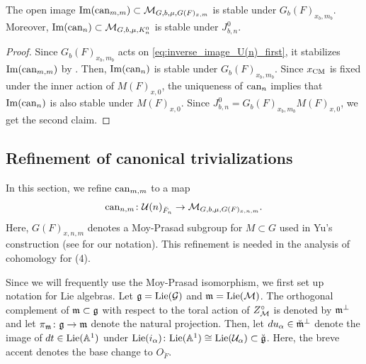 \documentclass[12pt,reqno]{amsart}
\begin{document}
\begin{prop} \label{prop:stability_Img_can_n}
    The open image ${\operatorname{Im}}({\operatorname{can}}_{m, m}) \subset {\mathcal{M}}_{G, b, \mu, G(F)_{x, m}}$ is stable under $G_b(F)_{x_b, m_b}$. Moreover, ${\operatorname{Im}}({\operatorname{can}}_n) \subset {\mathcal{M}}_{G, b, \mu, K_n^0}$ is stable under $J_{b, n}^0$. 
\end{prop}
\begin{proof}
    Since $G_b(F)_{x_b, m_b}$ acts on \eqref{eq:inverse_image_U(n)_first}, it stabilizes ${\operatorname{Im}}({\operatorname{can}}_{m, m})$ by . Then, ${\operatorname{Im}}({\operatorname{can}}_n)$ is stable under $G_b(F)_{x_b, m_b}$. Since $x_{\operatorname{CM}}$ is fixed under the inner action of $M(F)_{x, 0}$, the uniqueness of ${\operatorname{can}}_n$ implies that ${\operatorname{Im}}({\operatorname{can}}_n)$ is also stable under $M(F)_{x, 0}$. Since $J_{b, n}^0 = G_b(F)_{x_b, m_b} M(F)_{x, 0}$, we get the second claim. 
\end{proof}

\subsection{Refinement of canonical trivializations}

In this section, we refine ${\operatorname{can}}_{m, m}$ to a map
\[
    {\operatorname{can}}_{n, m} \colon {\mathcal{U}}(n)_{\breve{F}_n} \to {\mathcal{M}}_{G, b, \mu, G(F)_{x, n, m}}. 
\]
Here, $G(F)_{x, n, m}$ denotes a Moy-Prasad subgroup for $M \subset G$ used in Yu's construction (see  for our notation). This refinement is needed in the analysis of cohomology for  (4).

Since we will frequently use the Moy-Prasad isomorphism, we first set up notation for Lie algebras. Let ${\mathfrak{g}} = {\operatorname{Lie}}({\mathcal{G}})$ and ${\mathfrak{m}} = {\operatorname{Lie}}({\mathcal{M}})$. The orthogonal complement of ${\mathfrak{m}} \subset {\mathfrak{g}}$ with respect to the toral action of $Z_{{\mathcal{M}}}^\circ$ is denoted by ${\mathfrak{m}}^\perp$ and let $\pi_{{\mathfrak{m}}} \colon {\mathfrak{g}} \to {\mathfrak{m}}$ denote the natural projection. Then, let $du_\alpha \in \breve{{\mathfrak{m}}}^\perp$ denote the image of $dt \in {\operatorname{Lie}}(\mathbb{A}^1)$ under ${\operatorname{Lie}}(i_\alpha) \colon {\operatorname{Lie}}(\mathbb{A}^1) \cong {\operatorname{Lie}}({\mathcal{U}}_\alpha) \subset {\mathfrak{\breve{g}}}$. Here, the breve accent denotes the base change to $O_{\breve{F}}$. 
\end{document}
